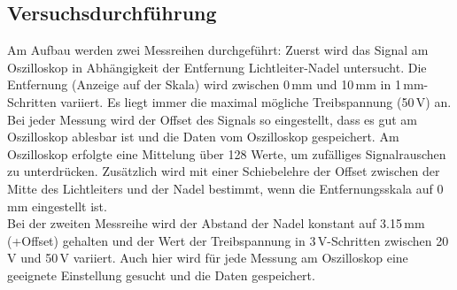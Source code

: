 \subsection{Versuchsdurchführung}

Am Aufbau werden zwei Messreihen durchgeführt:
Zuerst wird das Signal am Oszilloskop in Abhängigkeit der Entfernung Lichtleiter-Nadel untersucht.
Die Entfernung (Anzeige auf der Skala) wird zwischen 0\,mm und 10\,mm in 1\,mm-Schritten variiert.
Es liegt immer die maximal mögliche Treibspannung (50\,V) an.
Bei jeder Messung wird der Offset des Signals so eingestellt,
dass es gut am Oszilloskop ablesbar ist und die Daten vom Oszilloskop gespeichert.
Am Oszilloskop erfolgte eine Mittelung über 128 Werte, um zufälliges Signalrauschen zu unterdrücken.
Zusätzlich wird mit einer Schiebelehre der Offset zwischen der Mitte des Lichtleiters und der Nadel bestimmt,
wenn die Entfernungsskala auf 0\,mm eingestellt ist.\\
Bei der zweiten Messreihe wird der Abstand der Nadel konstant auf 3.15\,mm (+Offset)
gehalten und der Wert der Treibspannung in 3\,V-Schritten zwischen 20\,V und 50\,V variiert.
Auch hier wird für jede Messung am Oszilloskop eine geeignete Einstellung gesucht und die Daten gespeichert.